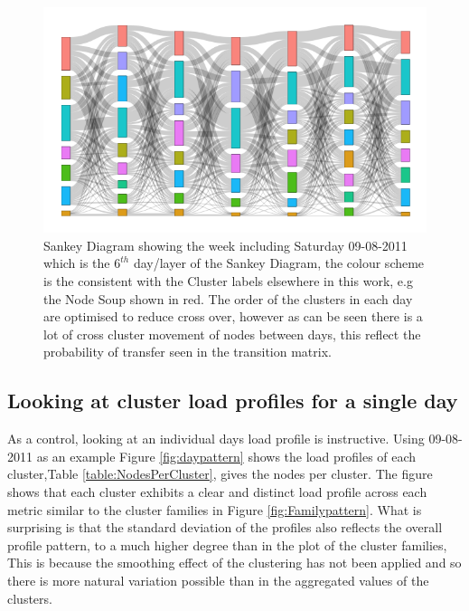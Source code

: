 \begin{figure}[ht]
    \centering
    \includegraphics[width=\textwidth]{Figures/Results/SankeyWeek.png}
    \caption[Sankey diagram for 1 week]{Sankey Diagram showing the week including Saturday 09-08-2011 which is the $6^{th}$ day/layer of the Sankey Diagram, the colour scheme is the consistent with the Cluster labels elsewhere in this work, e.g the Node Soup shown in red. The order of the clusters in each day are optimised to reduce cross over, however as can be seen there is a lot of cross cluster movement of nodes between days, this reflect the probability of transfer seen in the transition matrix. }
    \label{fig:SankeyWeek}
\end{figure}


\subsection{Looking at cluster load profiles for a single day}

As a control, looking at an individual days load profile is instructive. Using 09-08-2011 as an example Figure \ref{fig:daypattern} shows the load profiles of each cluster,Table \ref{table:NodesPerCluster}, gives the nodes per cluster. The figure shows that each cluster exhibits a clear and distinct load profile across each metric similar to the cluster families in Figure \ref{fig:Familypattern}. What is surprising is that the standard deviation of the profiles also reflects the overall profile pattern, to a much higher degree than in the plot of the cluster families, This is because the smoothing effect of the clustering has not been applied and so there is more natural variation possible than in the aggregated values of the clusters.

